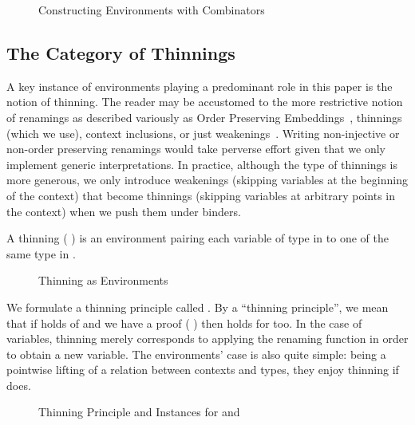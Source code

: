 \begin{figure}[h]
\caption{Constructing Environments with Combinators\label{fig:envcombinators}}
\end{figure}

\subsection{The Category of Thinnings}
\label{sec:categoryrenamings}

A key instance of environments playing a predominant role in this paper is the
notion of thinning. The reader may be accustomed to the more restrictive
notion of renamings as described variously as Order Preserving
Embeddings~\cite{chapman2009type}, thinnings (which we use), context
inclusions, or just weakenings~\cite{altenkirch1995categorical}.
Writing non-injective or non-order
preserving renamings would take perverse effort given that we only
implement generic interpretations. In practice, although the type of
thinnings is more generous, we only introduce weakenings (skipping
variables at the beginning of the context) that become thinnings
(skipping variables at arbitrary points in the context) when we push
them under binders.

A thinning (  ) is an environment pairing each variable
of type  in  to one of the same type in .

\begin{figure}[h]
\caption{Thinning as Environments\label{fig:thinnings}}
\end{figure}


We formulate a thinning principle called . By a ``thinning
principle'', we mean that if  holds of  and we have a proof
(  ) then  holds for  too. In the
case of variables, thinning merely corresponds to applying the renaming
function in order to obtain a new variable. The environments' case is also
quite simple: being a pointwise lifting of a relation  between
contexts and types, they enjoy thinning if  does.

\begin{figure}[h]
\caption{Thinning Principle and Instances for  and \label{fig:thinnable}}
\end{figure}

